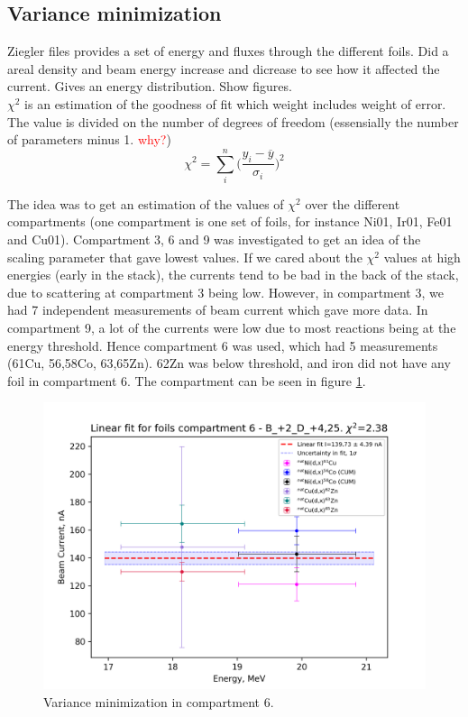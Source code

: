 \documentclass[a4paper,11pt,twoside]{book}
\begin{document}
\subsection{Variance minimization}
Ziegler files provides a set of energy and fluxes through the different foils. 
Did a areal density and beam energy increase and dicrease to see how it affected the current. Gives an energy distribution. Show figures.  \\

$\chi^2$ is an estimation of the goodness of fit which weight includes weight of error. The value is divided on the number of degrees of freedom (essensially the number of parameters minus 1. \textcolor{red}{why?})
\begin{equation} \label{eq:chi_squared}
    \chi^2 = \sum_{i}^n \Big(\frac{ y_i - \overline{y}}{ \sigma_i} \Big)^2 
\end{equation}

\noindent 
The idea was to get an estimation of the values of $\chi^2$ over the different compartments (one compartment is one set of foils, for instance Ni01, Ir01, Fe01 and Cu01). Compartment 3, 6 and 9 was investigated to get an idea of the scaling parameter that gave lowest values. If we cared about the $\chi^2$ values at high energies (early in the stack), the currents tend to be bad in the back of the stack, due to scattering at compartment 3 being low. However, in compartment 3, we had 7 independent measurements of beam current which gave more data. In compartment 9, a lot of the currents were low due to most reactions being at the energy threshold. Hence compartment 6 was used, which had 5 measurements (61Cu, 56,58Co, 63,65Zn). 62Zn was below threshold, and iron did not have any foil in compartment 6. The compartment can be seen in figure \ref{fig:varmin_comp6}. 

\begin{figure}
    \centering
    \includegraphics{Analysis/minimization_6_B_+2_D_+4,25.png}
    \caption{Variance minimization in compartment 6.}
    \label{fig:varmin_comp6}
\end{figure}
\end{document}
